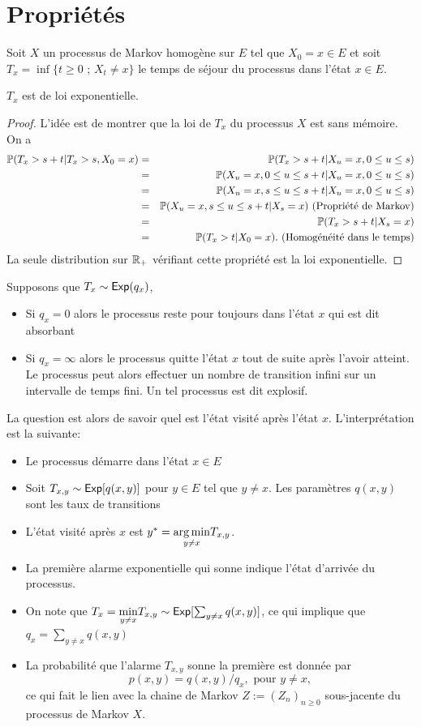 \section{Propriétés}\label{ssec:property_markov_process}
Soit $X$ un processus de Markov homogène sur $E$ tel que $X_0=x\in E$ et soit $T_x=\inf\{t\geq 0\text{ ; }X_t\neq x\}$ le temps de séjour du processus dans l'état $x\in E$.
\begin{prop}
$T_x$ est de loi exponentielle.
\end{prop}
\begin{proof}
L'idée est de montrer que la loi de $T_x$ du processus $X$ est sans mémoire. On a 
\begin{eqnarray*}
\mathbb{P}(T_x>s+t|T_x>s, X_0  =x)&=&\mathbb{P}(T_x>s+t| X_u =x,0\leq u\leq s)\\
&=&\mathbb{P}(X_u =x,0\leq u\leq s+t| X_u =x,0\leq u\leq s)\\
&=&\mathbb{P}(X_u =x,s\leq u\leq s+t| X_u =x,0\leq u\leq s)\\
&=&\mathbb{P}(X_u =x,s\leq u\leq s+t| X_s =x)\text{ (Propriété de Markov)}\\
&=&\mathbb{P}(T_x>s+t| X_s =x)\\
&=&\mathbb{P}(T_x>t| X_0 =x). \text{ (Homogénéité dans le temps)}\\
\end{eqnarray*}
La seule distribution sur $\mathbb{R}_+$ vérifiant cette propriété est la loi exponentielle.
\end{proof}
Supposons que $T_x\sim\mathsf{Exp}(q_x)$, 
\begin{itemize}
	\item Si $q_x = 0$ alors le processus reste pour toujours dans l'état $x$ qui est dit absorbant
	\item Si $q_x = \infty$ alors le processus quitte l'état $x$ tout de suite après l'avoir atteint. Le processus peut alors effectuer un nombre de transition infini sur un intervalle de temps fini. Un tel processus est dit explosif.
\end{itemize}
La question est alors de savoir quel est l'état visité après l'état $x$. L'interprétation est la suivante: 
\begin{itemize}
	\item Le processus démarre dans l'état $x\in E$
	\item Soit $T_{x,y}\sim\mathsf{Exp}[q(x,y)]$ pour $y\in E$ tel que $y\neq x$. Les paramètres $q(x,y)$ sont les taux de transitions
	\item L'état visité après $x$ est $y^\ast = \underset{y\neq x}{\operatorname*{arg\,min}} T_{x,y}$.
	\item La première alarme exponentielle qui sonne indique l'état d'arrivée du processus.
	\item On note que $T_x = \underset{y\neq x}{\min} T_{x,y}\sim\mathsf{Exp}[\sum_{y\neq x}q(x,y)]$, ce qui implique que $q_x = \sum_{y\neq x}q(x,y)$
	\item La probabilité que l'alarme $T_{x,y}$ sonne la première est donnée par 
	$$
	p(x,y) = q(x,y)/ q_x,\text{ pour }y\neq x,
	$$
	ce qui fait le lien avec la chaine de Markov $Z:=(Z_n)_{n\geq0}$ sous-jacente du processus de Markov $X$.
\end{itemize}
